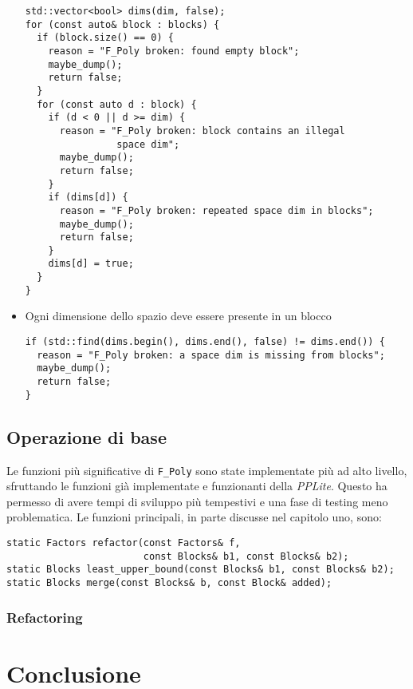 \documentclass{mimosis}
\theoremstyle{definition}
\begin{document}
\begin{itemize}
\begin{verbatim}
std::vector<bool> dims(dim, false);
for (const auto& block : blocks) {
  if (block.size() == 0) {
    reason = "F_Poly broken: found empty block";
    maybe_dump();
    return false;
  }
  for (const auto d : block) {
    if (d < 0 || d >= dim) {
      reason = "F_Poly broken: block contains an illegal
                space dim";
      maybe_dump();
      return false;
    }
    if (dims[d]) {
      reason = "F_Poly broken: repeated space dim in blocks";
      maybe_dump();
      return false;
    }
    dims[d] = true;
  }
}
\end{verbatim}
\item Ogni dimensione dello spazio deve essere presente in un blocco
\begin{verbatim}
if (std::find(dims.begin(), dims.end(), false) != dims.end()) {
  reason = "F_Poly broken: a space dim is missing from blocks";
  maybe_dump();
  return false;
}
\end{verbatim}
\end{itemize}

\section{Operazione di base}
\label{sec:org0e0c82d}
Le funzioni più significative di \texttt{F\_Poly} sono state implementate più ad alto
livello, sfruttando le funzioni già implementate e funzionanti della \emph{PPLite}.
Questo ha permesso di avere tempi di sviluppo più tempestivi e una fase di
testing meno problematica. Le funzioni principali, in parte discusse nel
capitolo uno, sono:

\begin{verbatim}
static Factors refactor(const Factors& f,
                        const Blocks& b1, const Blocks& b2);
static Blocks least_upper_bound(const Blocks& b1, const Blocks& b2);
static Blocks merge(const Blocks& b, const Block& added);
\end{verbatim}

\subsection{Refactoring}
\label{sec:org10cb8fe}


\chapter{Conclusione}
\label{sec:org3fdafea}
\end{document}
